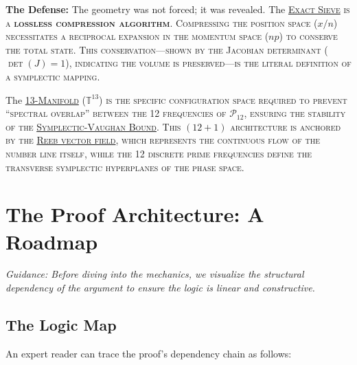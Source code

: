 \documentclass[sn-mathphys-num, pdflatex, referee]{sn-jnl}
\newcommand{\gterm}[2]{\begingroup\normalfont\scshape\hyperlink{#1}{#2}\endgroup}
\begin{document}
\textbf{The Defense:} The geometry was not forced; it was revealed. The \gterm{exact_sieve}{Exact Sieve} is a \textbf{lossless compression algorithm}. Compressing the position space ($x/n$) necessitates a reciprocal expansion in the momentum space ($np$) to conserve the total state. This conservation---shown by the Jacobian determinant ($\det(J)=1$), indicating the volume is preserved---is the literal definition of a symplectic mapping. 

The \gterm{m13}{13-Manifold} ($\mathbb{T}^{13}$) is the specific configuration space required to prevent ``spectral overlap'' between the 12 frequencies of $\mathcal{P}_{12}$, ensuring the stability of the \gterm{csv}{Symplectic-Vaughan Bound}. This $(12+1)$ architecture is anchored by the \gterm{reeb}{Reeb vector field}, which represents the continuous flow of the number line itself, while the 12 discrete prime frequencies define the transverse symplectic hyperplanes of the phase space.

\section{The Proof Architecture: A Roadmap}

\textit{Guidance: Before diving into the mechanics, we visualize the structural dependency of the argument to ensure the logic is linear and constructive.} 

\subsection{The Logic Map}
An expert reader can trace the proof's dependency chain as follows:
\end{document}
